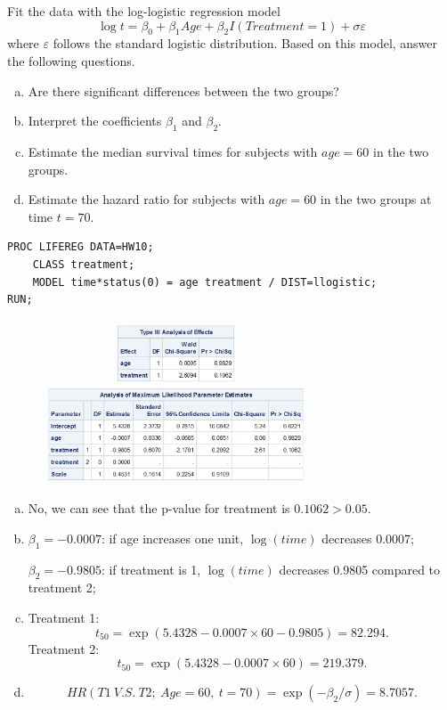 \documentclass{elegantbook}
\begin{document}
\begin{exercise*}[2]
    Fit the data with the log-logistic regression model
    \[\log t=\beta_0+\beta_1 Age +\beta_2 I(Treatment=1)+\sigma\varepsilon\]
    where $\varepsilon$ follows the standard logistic distribution. Based on this model, answer the following questions. 
    \begin{enumerate}[(a)]
        \item Are there significant differences between the two groups? 
        \item Interpret the coefficients $\beta_1$ and $\beta_2$. 
        \item Estimate the median survival times for subjects with $age=60$ in the two groups. 
        \item Estimate the hazard ratio for subjects with $age=60$ in the two groups at time $t = 70$.
    \end{enumerate}
\end{exercise*}


\begin{solution}
    \begin{verbatim}
PROC LIFEREG DATA=HW10;
    CLASS treatment;
    MODEL time*status(0) = age treatment / DIST=llogistic;
RUN;
    \end{verbatim}
    \begin{figure}[H]
        \centering
        \includegraphics[width=0.7\textwidth]{HW10_2.png}
    \end{figure}
\begin{enumerate}[(a)]
    \item No, we can see that the p-value for treatment is $0.1062>0.05$. 
    \item $\beta_1=-0.0007$: if age increases one unit, $\log(time)$ decreases 0.0007; 
    
    $\beta_2=-0.9805$: if treatment is 1, $\log(time)$ decreases 0.9805 compared to treatment 2; 
    \item Treatment 1:
    \[ t_{50} = \exp( 5.4328 - 0.0007 \times 60 - 0.9805 )= 82.294. \]
    Treatment 2: 
    \[t_{50} = \exp(5.4328 - 0.0007 \times 60) = 219.379. \]
    \item \[HR(T1\ V.S.\ T2;\ Age=60,\ t=70)=\exp(-\beta_2/\sigma)=8.7057. \]
\end{enumerate}
\end{solution}
\end{document}
